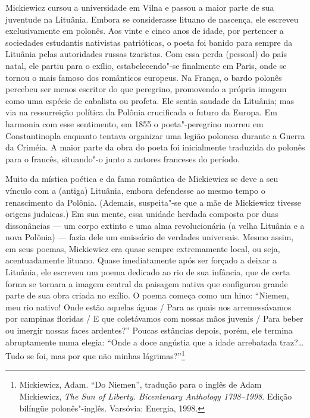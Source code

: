 Mickiewicz cursou a universidade em Vilna e passou a maior parte de sua
juventude na Lituânia. Embora se considerasse lituano de nascença, ele
escreveu exclusivamente em polonês. Aos vinte e cinco anos de idade, por
pertencer a sociedades estudantis nativistas patrióticas, o poeta foi
banido para sempre da Lituânia pelas autoridades russas tzaristas. Com
essa perda (pessoal) do país natal, ele partiu para o exílio,
estabelecendo"-se finalmente em Paris, onde se tornou o mais famoso dos
românticos europeus. Na França, o bardo polonês percebeu ser menos
escritor do que peregrino, promovendo a própria imagem como uma espécie
de cabalista ou profeta. Ele sentia saudade da Lituânia; mas via na
ressurreição política da Polônia crucificada o futuro da Europa. Em
harmonia com esse sentimento, em 1855 o poeta"-peregrino morreu em
Constantinopla enquanto tentava organizar uma legião polonesa durante a
Guerra da Criméia. A maior parte da obra do poeta foi inicialmente
traduzida do polonês para o francês, situando"-o junto a autores
franceses do período.

Muito da mística poética e da fama romântica de Mickiewicz se deve a seu
vínculo com a (antiga) Lituânia, embora defendesse ao mesmo tempo o
renascimento da Polônia. (Ademais, suspeita"-se que a mãe de Mickiewicz
tivesse origens judaicas.) Em sua mente, essa unidade herdada composta
por duas dissonâncias --- um corpo extinto e uma alma revolucionária (a
velha Lituânia e a nova Polônia) --- fazia dele um emissário de verdades
universais. Mesmo assim, em seus poemas, Mickiewicz era quase sempre
extremamente local, ou seja, acentuadamente lituano. Quase imediatamente
após ser forçado a deixar a Lituânia, ele escreveu um poema dedicado ao
rio de sua infância, que de certa forma se tornara a imagem central da
paisagem nativa que configurou grande parte de sua obra criada no
exílio. O poema começa como um hino: ``Niemen, meu rio nativo! Onde
estão aquelas águas / Para as quais nos arremessávamos por campinas
floridas / E que coletávamos com nossas mãos juvenis / Para beber ou
imergir nossas faces ardentes?'' Poucas estâncias depois, porém, ele
termina abruptamente numa elegia: ``Onde a doce angústia que a idade
arrebatada traz?\ldots{} Tudo se foi, mas por que não minhas
lágrimas?''\footnote{Mickiewicz, Adam. ``Do Niemen'', tradução para o
  inglês de Adam Mickiewicz, \emph{The Sun of Liberty. Bicentenary
  Anthology 1798--1998}. Edição bilíngüe polonês"-inglês. Varsóvia:
  Energia, 1998.}

